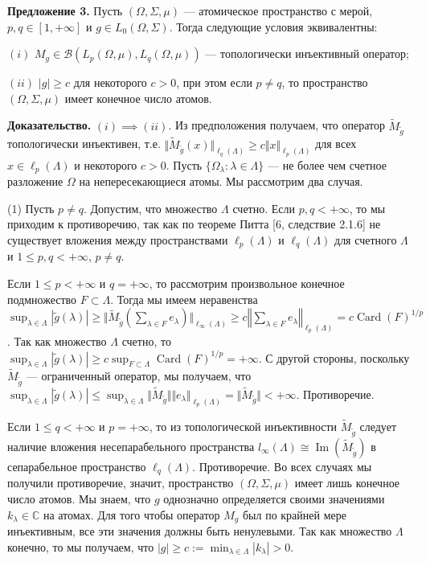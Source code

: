 \documentclass[11pt,twoside]{article}
\begin{document}
\textbf{Предложение 3.} Пусть $(\Omega,\Sigma,\mu)$ --- атомическое пространство
с мерой, $p,q\in[1,+\infty]$ и $g\in L_0(\Omega,\Sigma)$. Тогда следующие
условия эквивалентны:

$(i)$ $M_g\in\mathcal{B}(L_p(\Omega,\mu),L_q(\Omega,\mu))$ --- топологически
инъективный оператор;

$(ii)$ $|g|\geq c$ для некоторого $c>0$, при этом если $p\neq q$, то
пространство $(\Omega,\Sigma,\mu)$ имеет конечное число атомов.


\textbf{Доказательство.} $(i)$$\implies$$(ii)$.
        Из предположения получаем, что
        оператор $\widetilde{M}_{\widetilde{g}}$ топологически инъективен, т.е.
    $\Vert\widetilde{M}_{\widetilde{g}}(x)\Vert_{\ell_q(\Lambda)}\geq c\Vert
    x\Vert_{\ell_p(\Lambda)}$ для всех $x\in\ell_p(\Lambda)$ и некоторого
    $c>0$. Пусть $ \{\Omega_\lambda:\lambda\in\Lambda \}$ --- не более чем
        счетное разложение $\Omega$ на непересекающиеся атомы. Мы рассмотрим два
        случая.

        (1) Пусть $p\neq q$. Допустим, что множество $\Lambda$ счетно. Если
    $p,q<+\infty$, то мы приходим к противоречию, так как по теореме Питта
        [6, следствие 2.1.6] не существует вложения между пространствами
    $\ell_p(\Lambda)$ и $\ell_q(\Lambda)$ для счетного $\Lambda$ и $1\leq
    p,q<+\infty$, $p\neq q$.

        Если $1\leq p<+\infty$ и $q=+\infty$, то рассмотрим произвольное
        конечное подмножество $F\subset\Lambda$. Тогда мы имеем неравенства $
    \sup_{\lambda\in\Lambda}|\widetilde{g}(\lambda)|
    \geq\Vert\widetilde{M}_{\widetilde{g}}\left(\sum\nolimits_{\lambda\in
        F}e_\lambda\right)\Vert_{\ell_\infty(\Lambda)} \geq
    c\left\Vert\sum\nolimits_{\lambda\in
        F}e_\lambda\right\Vert_{\ell_p(\Lambda)}
    =c{\operatorname{Card}(F)}^{1/p}$. Так как множество $\Lambda$ счетно,
        то $\sup_{\lambda\in\Lambda}|\widetilde{g}(\lambda)|\geq
    c\sup_{F\subset\Lambda}{\operatorname{Card}(F)}^{1/p}=+\infty$. С другой
        стороны, поскольку $\widetilde{M}_{\widetilde{g}}$ --- ограниченный
        оператор, мы получаем, что
    $\sup_{\lambda\in\Lambda}|\widetilde{g}(\lambda)|
    \leq\sup_{\lambda\in\Lambda}\Vert\widetilde{M}_{\widetilde{g}}\Vert\Vert
    e_\lambda\Vert_{\ell_p(\Lambda)}
    =\Vert\widetilde{M}_{\widetilde{g}}\Vert<+\infty$. Противоречие.

        Если $1\leq q<+\infty$ и $p=+\infty$, то из топологической инъективности
    $\widetilde{M}_{\widetilde{g}}$ следует наличие вложения несепарабельного
        пространства
    $l_\infty(\Lambda)\cong\operatorname{Im}(\widetilde{M}_{\widetilde{g}})$ в
        сепарабельное пространство $\ell_q(\Lambda)$. Противоречие. Во всех случаях
        мы получили противоречие, значит, пространство $(\Omega,\Sigma,\mu)$ имеет
        лишь конечное число атомов. Мы знаем, что $g$ однозначно определяется своими
        значениями $k_\lambda\in\mathbb{C}$ на атомах. Для того чтобы оператор $M_g$
        был по крайней мере инъективным, все эти значения должны быть ненулевыми.
        Так как множество $\Lambda$ конечно, то мы получаем, что $|g|\geq
    c:=\min_{\lambda\in\Lambda}|k_\lambda|>0$.
\end{document}

